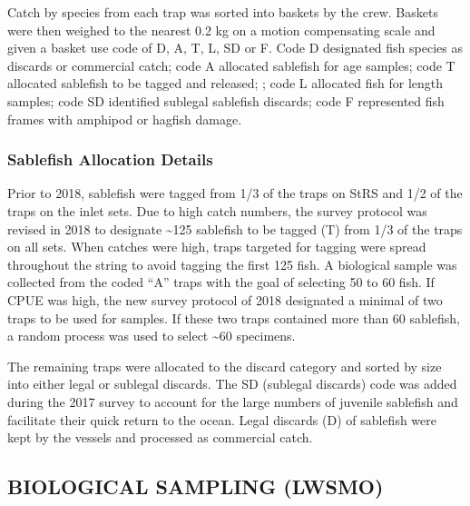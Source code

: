 \documentclass[12pt]{article}\usepackage[]{graphicx}\usepackage[]{color}
\begin{document}
Catch by species from each trap was sorted into baskets by the crew. Baskets were then weighed to the nearest 0.2 kg on a motion compensating scale and given a basket use code of D, A, T, L, SD or F. Code D designated fish species as discards or commercial catch; code A allocated sablefish for age samples; code T allocated sablefish to be tagged and released; ; code L allocated fish for length samples; code SD identified sublegal sablefish discards; code F represented fish frames with amphipod or hagfish damage.

\hypertarget{sablefish-allocation-details}{%
\subsubsection{Sablefish Allocation Details}\label{sablefish-allocation-details}}

Prior to 2018, sablefish were tagged from 1/3 of the traps on StRS and 1/2 of the traps on the inlet sets. Due to high catch numbers, the survey protocol was revised in 2018 to designate \textasciitilde125 sablefish to be tagged (T) from 1/3 of the traps on all sets. When catches were high, traps targeted for tagging were spread throughout the string to avoid tagging the first 125 fish. A biological sample was collected from the coded ``A'' traps with the goal of selecting 50 to 60 fish. If CPUE was high, the new survey protocol of 2018 designated a minimal of two traps to be used for samples. If these two traps contained more than 60 sablefish, a random process was used to select \textasciitilde60 specimens.

The remaining traps were allocated to the discard category and sorted by size into either legal or sublegal discards. The SD (sublegal discards) code was added during the 2017 survey to account for the large numbers of juvenile sablefish and facilitate their quick return to the ocean. Legal discards (D) of sablefish were kept by the vessels and processed as commercial catch.

\hypertarget{biological-sampling-lwsmo}{%
\subsection{BIOLOGICAL SAMPLING (LWSMO)}\label{biological-sampling-lwsmo}}
\end{document}
